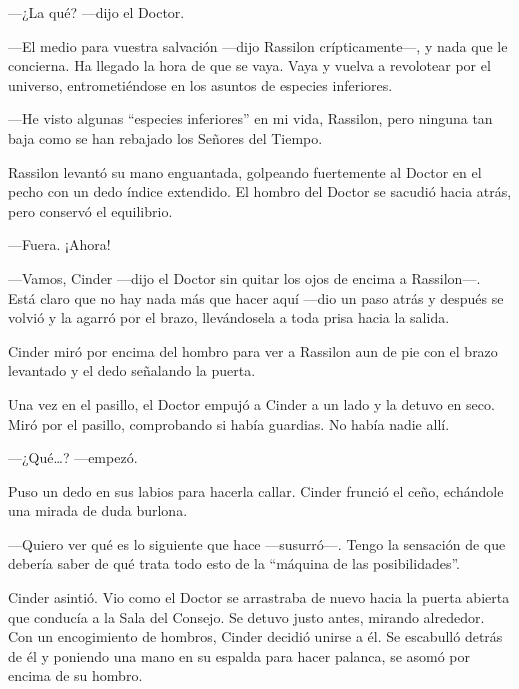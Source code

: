 —¿La qué? —dijo el Doctor. 



—El medio para vuestra salvación —dijo Rassilon crípticamente—, y nada que le concierna. Ha llegado la hora de que se vaya. Vaya y vuelva a revolotear por el universo, entrometiéndose en los asuntos de especies inferiores. 



—He visto algunas “especies inferiores” en mi vida, Rassilon, pero ninguna tan baja como se han rebajado los Señores del Tiempo. 



Rassilon levantó su mano enguantada, golpeando fuertemente al Doctor en el pecho con un dedo índice extendido. El hombro del Doctor se sacudió hacia atrás, pero conservó el equilibrio. 



—Fuera. ¡Ahora! 



—Vamos, Cinder —dijo el Doctor sin quitar los ojos de encima a Rassilon—. Está claro que no hay nada más que hacer aquí —dio un paso atrás y después se volvió y la agarró por el brazo, llevándosela a toda prisa hacia la salida. 



Cinder miró por encima del hombro para ver a Rassilon aun de pie con el brazo levantado y el dedo señalando la puerta. 

Una vez en el pasillo, el Doctor empujó a Cinder a un lado y la detuvo en seco. Miró por el pasillo, comprobando si había guardias. No había nadie allí. 



—¿Qué…? —empezó. 



Puso un dedo en sus labios para hacerla callar. Cinder frunció el ceño, echándole una mirada de duda burlona. 



—Quiero ver qué es lo siguiente que hace —susurró—. Tengo la sensación de que debería saber de qué trata todo esto de la “máquina de las posibilidades”. 



Cinder asintió. Vio como el Doctor se arrastraba de nuevo hacia la puerta abierta que conducía a la Sala del Consejo. Se detuvo justo antes, mirando alrededor. Con un encogimiento de hombros, Cinder decidió unirse a él. Se escabulló detrás de él y poniendo una mano en su espalda para hacer palanca, se asomó por encima de su hombro. 

